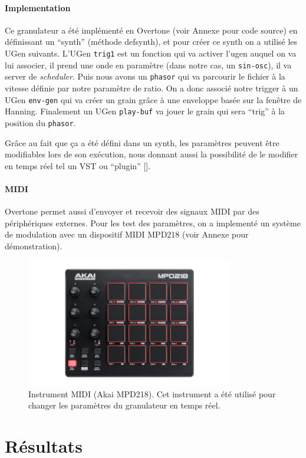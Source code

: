 \documentclass[letterpaper]{article}
\begin{document}
\paragraph{Implementation}
Ce granulateur a été implémenté en Overtone (voir Annexe pour code source) en définissant
un ``synth'' (méthode defsynth), et pour créer ce synth on a utilisé les UGen suivants.
L'UGen \verb+trig1+ est un fonction qui va activer l'ugen auquel on va lui associer, il
prend une onde en paramètre (dans notre cas, un \verb+sin-osc+), il va server de \emph{scheduler}.
Puis nous avons un \verb+phasor+ qui va parcourir le fichier à la vitesse définie par notre paramètre
de ratio. On a donc associé notre trigger à un UGen \verb+env-gen+ qui va créer un grain grâce à
une enveloppe basée sur la fenêtre de Hanning. Finalement un UGen \verb+play-buf+ va jouer le grain
qui sera ``trig'' à la position du \verb+phasor+.

Grâce au fait que ça a été défini dans un synth, les paramètres peuvent être modifiables lors de son
exécution, nous donnant aussi la possibilité de le modifier en temps réel tel un VST ou ``plugin''
[\cite{VST}].

\paragraph {MIDI}
Overtone permet aussi d'envoyer et recevoir des signaux MIDI par des périphériques externes. Pour les
test des paramètres, on a implementé un système de modulation avec un dispositif MIDI MPD218 (voir
Annexe pour démonstration). 

\begin{figure}[h]
    \centerline{\includegraphics[width=9cm]{res/mpd218.png}}
    \caption{\label{fig:mpd218}
      Instrument MIDI (Akai MPD218). Cet instrument a été utilisé pour
      changer les paramètres du granulateur en temps réel.
    }
  \end{figure}

  \section{Résultats}
\end{document}
